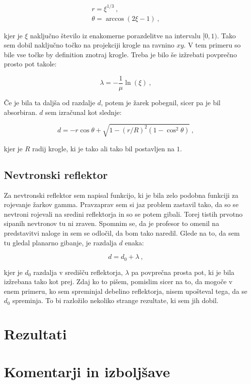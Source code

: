 \documentclass[a4paper]{article}
\begin{document}
\begin{gather}
    r = \xi^{1/3}\>, \\
    \theta = \arccos(2 \xi - 1)\>,
\end{gather}

kjer je $\xi$ naključno število iz enakomerne porazdelitve na intervalu $[0,1)$. Tako sem dobil naključno točko na projekciji 
krogle na ravnino $xy$. V tem primeru so bile vse točke by definition znotraj krogle. Treba je bilo še izžrebati povprečno prosto
pot takole:

\begin{equation}
    \lambda = -\frac{1}{\mu} \ln(\xi)\>,
\end{equation}

Če je bila ta daljša od razdalje $d$, potem je žarek pobegnil, sicer pa je bil absorbiran. $d$ sem izračunal kot slednje:

\begin{equation}
    d = -r \cos\theta + \sqrt{1 - ({r}/{R})^2(1-\cos^2\theta)}\>,
\end{equation}

kjer je $R$ radij krogle, ki je tako ali tako bil postavljen na $1$. \\

\subsection{Nevtronski reflektor}
Za nevtronski reflektor sem napisal funkcijo, ki je bila zelo podobna funkciji za rojevanje žarkov gamma. Pravzaprav sem si jaz problem 
zastavil tako, da so se nevtroni rojevali na sredini reflektorja in so se potem gibali. Torej tistih prvotno sipanih nevtronov tu ni zraven.
Spomnim se, da je profesor to omenil na predstavitvi naloge in sem se odločil, da bom tako naredil. Glede na to, da sem tu gledal planarno 
gibanje, je razdalja $d$ enaka:

\begin{equation}
    d = d_0 + \lambda\>,
\end{equation}

kjer je $d_0$ razdalja v središču reflektorja, $\lambda$ pa povprečna prosta pot, ki je bila izžrebana tako kot prej. Zdaj ko to pišem,
pomislim sicer na to, da mogoče v enem primeru, ko sem spreminjal debelino reflektorja, nisem upošteval tega, da se $d_0$ spreminja. To 
bi razložilo nekoliko strange rezultate, ki sem jih dobil. \\




\section{Rezultati}


\section{Komentarji in izboljšave}

\newpage


\end{document}
